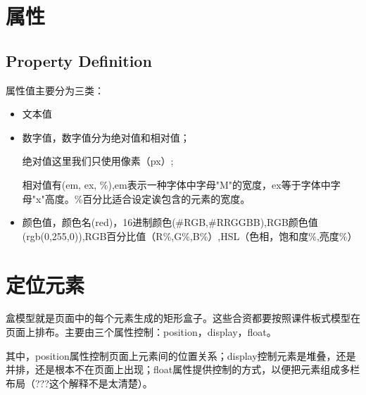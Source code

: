 




\section{属性}

\subsection{Property Definition}



属性值主要分为三类：

\begin{itemize}
\item 文本值
\item 数字值，数字值分为绝对值和相对值；

绝对值这里我们只使用像素（px）;

相对值有(em, ex, \%),em表示一种字体中字母"M"的宽度，ex等于字体中字母"x"高度。\%百分比适合设定诶包含的元素的宽度。

\item 颜色值，颜色名(red)，16进制颜色(\#RGB,\#RRGGBB),RGB颜色值(rgb(0,255,0)),RGB百分比值（R\%,G\%,B\%）,HSL（色相，饱和度\%,亮度\%）
\end{itemize}


\section{定位元素}

盒模型就是页面中的每个元素生成的矩形盒子。这些合资都要按照课件板式模型在页面上排布。主要由三个属性控制：position，display，float。

其中，position属性控制页面上元素间的位置关系；display控制元素是堆叠，还是并排，还是根本不在页面上出现；float属性提供控制的方式，以便把元素组成多栏布局（???这个解释不是太清楚）。

